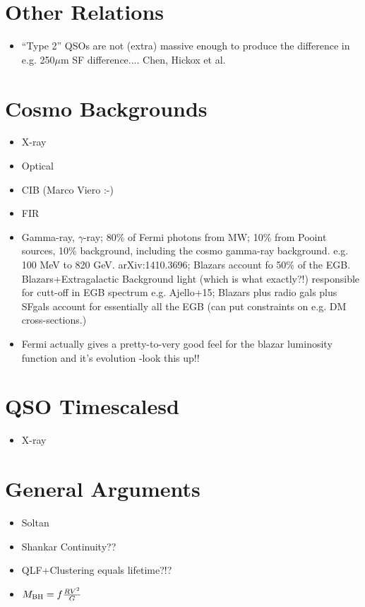 \documentclass[usenatbib]{mn2e}
\begin{document}
\section{Other Relations} %
\begin{itemize}
    \item{``Type 2'' QSOs are not (extra) massive enough to produce the difference in e.g. 250$\mu$m SF difference.... Chen, Hickox et al.}

\end{itemize}


\section{Cosmo Backgrounds} %
\begin{itemize}
  \item{X-ray}
    \item{Optical}
      \item{CIB (Marco Viero :-)   }
      \item{FIR}
      \item{Gamma-ray, $\gamma$-ray; 80\% of Fermi photons from MW; 10\% from Pooint sources, 10\% background, including the cosmo gamma-ray background. e.g. 100 MeV to 820 GeV. arXiv:1410.3696; Blazars account fo 50\% of the EGB. 
Blazars+Extragalactic Background light (which is what exactly?!) responsible for cutt-off in EGB spectrum e.g. Ajello+15; Blazars plus radio gals plus SFgals account for essentially all the EGB (can put constraints on e.g. DM cross-sections.)}
\item{Fermi actually gives a pretty-to-very good feel for the blazar luminosity function and it's evolution -look this up!!}
\end{itemize}


\section{QSO Timescalesd}
\begin{itemize}
  \item{X-ray}
\end{itemize}



\section{General Arguments} %
\begin{itemize}
    \item{Soltan}
    \item{Shankar Continuity??}
    \item{QLF+Clustering equals lifetime?!?}
      \item{$M_{\rm BH} = f \frac{R V^{2}}{G}$}
\end{itemize}
\end{document}
